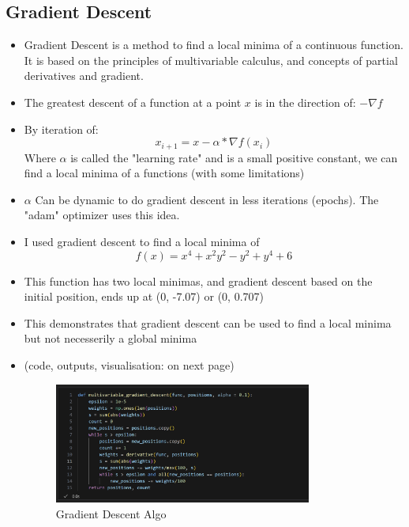 \documentclass[12pt,a4paper]{article}
\begin{document}
\subsection{Gradient Descent}
\begin{itemize}
\item Gradient Descent is a method to find a local minima of a continuous function. It is based on the principles of multivariable calculus, and concepts of partial derivatives and gradient.
\item The greatest descent of a function at a point $x$ is in the direction of: $-\nabla f$
\item By iteration of:
 \[x_{i+1} = x - \alpha * \nabla f(x_{i})\]
\subitem Where $\alpha$ is called the "learning rate" and is a small positive constant, we can find a local minima of a functions (with some limitations)
\item $\alpha$ Can be dynamic to do gradient descent in less iterations (epochs). The "adam" optimizer uses this idea.
\item I used gradient descent to find a local minima of 
\[f(x) = x^4 + x^2y^2 - y^2 + y^4 + 6 \]
\item This function has two local minimas, and gradient descent based on the initial position, ends up at (0, -7.07) or (0, 0.707)
\item This demonstrates that gradient descent can be used to find a local minima but not necesserily a global minima 
\item (code, outputs, visualisation: on next page)
\pagebreak
\begin{figure}[h!]
    \centering
    \includegraphics[width=0.8\textwidth]{grad1} 
    \caption{Gradient Descent Algo}
    \label{fig:example}
\end{figure}


\end{itemize}
\end{document}
